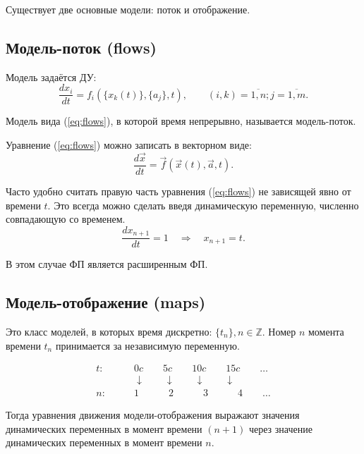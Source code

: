 Существует две основные модели: поток и отображение.

\subsection{Модель-поток (flows)}

Модель задаётся ДУ:
\begin{equation}\label{eq:flows}
	\frac{dx_i}{dt}=f_i(\{x_k(t)\}, \{a_j\}, t), \qquad (i,k)=\overline{1,n}; j=\overline{1,m}.
\end{equation}

\begin{definition}
	Модель вида (\ref{eq:flows}), в которой время непрерывно, называется модель-поток.
\end{definition}
 
 Уравнение (\ref{eq:flows}) можно записать в векторном виде:
 \begin{equation}
	 \frac{d\vec{x}}{dt}=\vec{f}(\vec{x}(t), \vec{a}, t).
 \end{equation}
 
 Часто удобно считать правую часть уравнения (\ref{eq:flows}) не зависящей явно от времени $t$. Это всегда можно сделать введя динамическую переменную, численно совпадающую со временем.
 $$\frac{dx_{n+1}}{dt}=1 \quad \Rightarrow \quad x_{n+1}=t.$$
 
 В этом случае ФП является расширенным ФП.

\subsection{Модель-отображение (maps)}

Это класс моделей, в которых время дискретно: $\{t_n\}, n \in \mathbb{Z}$. Номер $n$ момента времени $t_n$ принимается за независимую переменную.

\begin{example}
	\begin{align*}
		t:& \qquad 0c \qquad 5c \qquad 10c \qquad 15c \qquad \ldots \\
		&\qquad \downarrow \qquad \downarrow \qquad \downarrow \qquad \downarrow \\
		n:& \qquad 1 \qquad \quad 2 \qquad \quad 3 \qquad \quad 4 \qquad \ldots
	\end{align*}
\end{example}

Тогда уравнения движения модели-отображения выражают значения динамических переменных в момент времени $(n+1)$ через значение динамических переменных в момент времени $n$.


